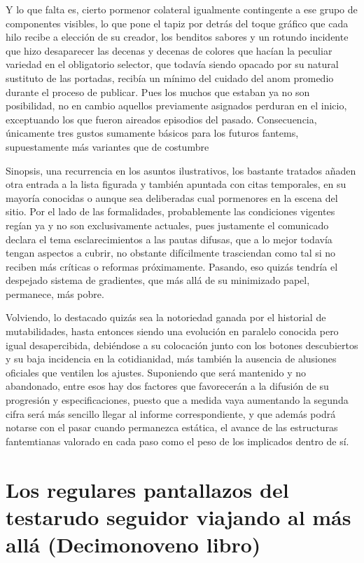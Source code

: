 \documentclass[
]{book}
\begin{document}
Y lo que falta es, cierto pormenor colateral igualmente contingente a ese grupo de componentes visibles, lo que pone el tapiz por detrás del toque gráfico que cada hilo recibe a elección de su creador, los benditos sabores y un rotundo incidente que hizo desaparecer las decenas y decenas de colores que hacían la peculiar variedad en el obligatorio selector, que todavía siendo opacado por su natural sustituto de las portadas, recibía un mínimo del cuidado del anom promedio durante el proceso de publicar. Pues los muchos que estaban ya no son posibilidad, no en cambio aquellos previamente asignados perduran en el inicio, exceptuando los que fueron aireados episodios del pasado. Consecuencia, únicamente tres gustos sumamente básicos para los futuros fantems, supuestamente más variantes que de costumbre

Sinopsis, una recurrencia en los asuntos ilustrativos, los bastante tratados añaden otra entrada a la lista figurada y también apuntada con citas temporales, en su mayoría conocidas o aunque sea deliberadas cual pormenores en la escena del sitio. Por el lado de las formalidades, probablemente las condiciones vigentes regían ya y no son exclusivamente actuales, pues justamente el comunicado declara el tema esclarecimientos a las pautas difusas, que a lo mejor todavía tengan aspectos a cubrir, no obstante difícilmente trasciendan como tal si no reciben más críticas o reformas próximamente. Pasando, eso quizás tendría el despejado sistema de gradientes, que más allá de su minimizado papel, permanece, más pobre.

Volviendo, lo destacado quizás sea la notoriedad ganada por el historial de mutabilidades, hasta entonces siendo una evolución en paralelo conocida pero igual desapercibida, debiéndose a su colocación junto con los botones descubiertos y su baja incidencia en la cotidianidad, más también la ausencia de alusiones oficiales que ventilen los ajustes. Suponiendo que será mantenido y no abandonado, entre esos hay dos factores que favorecerán a la difusión de su progresión y especificaciones, puesto que a medida vaya aumentando la segunda cifra será más sencillo llegar al informe correspondiente, y que además podrá notarse con el pasar cuando permanezca estática, el avance de las estructuras fantemtianas valorado en cada paso como el peso de los implicados dentro de sí.

\hypertarget{los-regulares-pantallazos-del-testarudo-seguidor-viajando-al-muxe1s-alluxe1-decimonoveno-libro}{%
\chapter{Los regulares pantallazos del testarudo seguidor viajando al más allá (Decimonoveno libro)}\label{los-regulares-pantallazos-del-testarudo-seguidor-viajando-al-muxe1s-alluxe1-decimonoveno-libro}}
\end{document}
